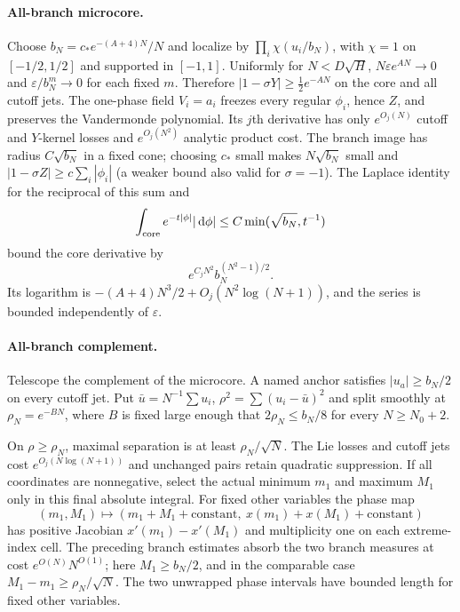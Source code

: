 \documentclass[11pt]{article}
\numberwithin{equation}{section}
\theoremstyle{definition}
\newcommand{\dd}{\,\mathrm d}
\newcommand{\eps}{\varepsilon}
\begin{document}
\paragraph{All-branch microcore.}
Choose $b_N=c_*e^{-(A+4)N}/N$ and localize by
$\prod_i\chi(u_i/b_N)$, with $\chi=1$ on $[-1/2,1/2]$ and
supported in $[-1,1]$. Uniformly for $N<D\sqrt H$,
$N\eps e^{AN}\to0$ and $\eps/b_N^m\to0$ for each fixed $m$.
Therefore $|1-\sigma Y|\ge\tfrac12e^{-AN}$ on the core and all
cutoff jets. The one-phase field $V_i=a_i$ freezes every regular
$\phi_i$, hence $Z$, and preserves the Vandermonde polynomial.
Its $j$th derivative has only $e^{O_j(N)}$ cutoff and $Y$-kernel losses
and $e^{O_j(N^2)}$ analytic product cost.
The branch image has radius $C\sqrt{b_N}$ in a fixed cone; choosing
$c_*$ small makes $N\sqrt{b_N}$ small and
$|1-\sigma Z|\ge c\sum_i|\phi_i|$ (a weaker bound also valid for
$\sigma=-1$). The Laplace identity for the reciprocal of this sum and
\[
 \int_{\rm core}e^{-t|\phi|}|\dd\phi|
 \le C\min(\sqrt{b_N},t^{-1})
\]
bound the core derivative by
\begin{equation}
 e^{C_jN^2}b_N^{(N^2-1)/2}.
 \label{iso:microcore}
\end{equation}
Its logarithm is $-(A+4)N^3/2+O_j(N^2\log(N+1))$, and the series
is bounded independently of $\eps$.

\paragraph{All-branch complement.}
Telescope the complement of the microcore. A named anchor satisfies
$|u_a|\ge b_N/2$ on every cutoff jet. Put
$\bar u=N^{-1}\sum u_i$, $\rho^2=\sum(u_i-\bar u)^2$ and split
smoothly at $\rho_N=e^{-BN}$, where $B$ is fixed large enough that
$2\rho_N\le b_N/8$ for every $N\ge N_0+2$.

On $\rho\ge\rho_N$, maximal separation is at least
$\rho_N/\sqrt N$. The Lie losses and cutoff jets cost
$e^{O_j(N\log(N+1))}$ and unchanged pairs retain quadratic
suppression. If all coordinates are nonnegative, select the actual
minimum $m_1$ and maximum $M_1$ only in this final absolute integral.
For fixed other variables the phase map
\[
 (m_1,M_1)\longmapsto
 (m_1+M_1+\text{constant},\ x(m_1)+x(M_1)+\text{constant})
\]
has positive Jacobian $x'(m_1)-x'(M_1)$ and multiplicity one on each
extreme-index cell. The preceding branch estimates absorb the two
branch measures at cost $e^{O(N)}N^{O(1)}$; here $M_1\ge b_N/2$,
and in the comparable case $M_1-m_1\ge\rho_N/\sqrt N$.
The two unwrapped phase intervals have bounded length for fixed other
variables.
\end{document}
